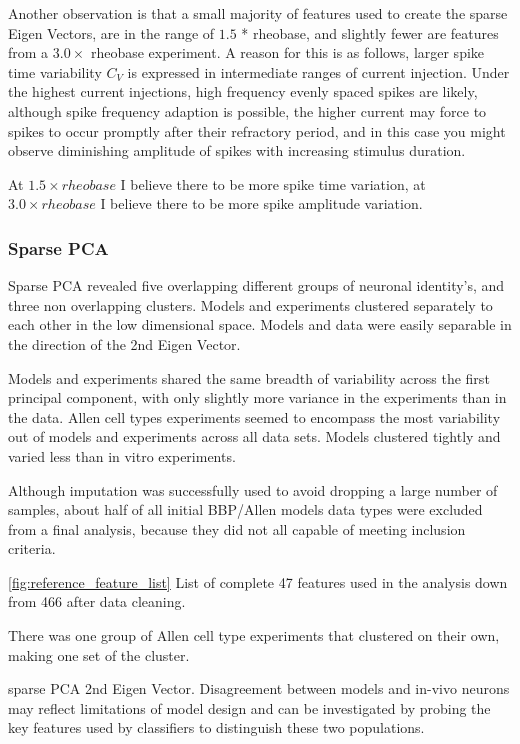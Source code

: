 Another observation is that a small majority of features used to create the sparse Eigen Vectors, are in the range of $1.5$ * rheobase, and slightly fewer are features from a $3.0\times$ rheobase experiment. A reason for this is as follows, larger spike time variability $C_{V}$ is expressed in intermediate ranges of current injection. Under the highest current injections, high frequency evenly spaced spikes are likely, although spike frequency adaption is possible, the higher current may force to spikes to occur promptly after their refractory period, and in this case you might observe diminishing amplitude of spikes with increasing stimulus duration.

At $1.5 \times rheobase $ I believe there to be more spike time variation, at $3.0 \times rheobase $  I believe there to be more spike amplitude variation.

\subsubsection{Sparse PCA}
Sparse PCA revealed five overlapping different groups of neuronal identity's, and three non overlapping clusters. Models and experiments clustered separately to each other in the low dimensional space. Models and data were easily separable in the direction of the 2nd Eigen Vector.

Models and experiments shared the same breadth of variability across the first principal component, with only slightly more variance in the experiments than in the data. Allen cell types experiments seemed to encompass the most variability out of models and experiments across all data sets. Models clustered tightly and varied less than in vitro experiments.



Although imputation was successfully used to avoid dropping a large number of samples, about half of all initial BBP/Allen models data types were excluded from a final analysis, because they did not all capable of meeting inclusion criteria.  

\ref{fig:reference_feature_list}
List of complete 47 features used in the analysis down from 466 after data cleaning.


There was one group of Allen cell type experiments that clustered on their own, making one set of the cluster.

sparse PCA 2nd Eigen Vector. 
Disagreement between models and in-vivo neurons may reflect limitations of model design and can be investigated by probing the key features used by classifiers to distinguish these two populations. 


